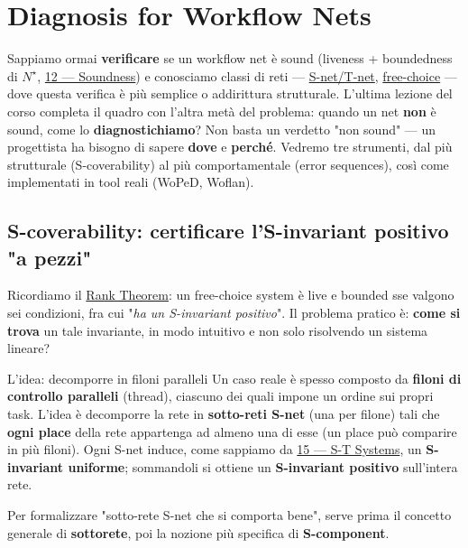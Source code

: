 \chapter{\texorpdfstring{Diagnosis for Workflow Nets}{Diagnosis for Workflow Nets}}
\label{ch:21}

Sappiamo ormai \textbf{verificare} se un workflow net è sound (liveness + boundedness di $N^\star$, \hyperref[ch:12]{12 — Soundness}) e conosciamo classi di reti — \hyperref[ch:15]{S-net/T-net}, \hyperref[ch:17]{free-choice} — dove questa verifica è più semplice o addirittura strutturale. L'ultima lezione del corso completa il quadro con l'altra metà del problema: quando un net \textbf{non} è sound, come lo \textbf{diagnostichiamo}? Non basta un verdetto "non sound" — un progettista ha bisogno di sapere \textbf{dove} e \textbf{perché}. Vedremo tre strumenti, dal più strutturale (S-coverability) al più comportamentale (error sequences), così come implementati in tool reali (WoPeD, Woflan).

\section{\texorpdfstring{S-coverability: certificare l'S-invariant positivo "a pezzi"}{S-coverability: certificare l'S-invariant positivo "a pezzi"}}

Ricordiamo il \hyperref[ch:17]{Rank Theorem}: un free-choice system è live e bounded sse valgono sei condizioni, fra cui "\emph{ha un S-invariant positivo}". Il problema pratico è: \textbf{come si trova} un tale invariante, in modo intuitivo e non solo risolvendo un sistema lineare?

\begin{boxtip}{L'idea: decomporre in filoni paralleli}
Un caso reale è spesso composto da \textbf{filoni di controllo paralleli} (thread), ciascuno dei quali impone un ordine sui propri task. L'idea è decomporre la rete in \textbf{sotto-reti S-net} (una per filone) tali che \textbf{ogni place} della rete appartenga ad almeno una di esse (un place può comparire in più filoni). Ogni S-net induce, come sappiamo da \hyperref[ch:15]{15 — S-T Systems}, un \textbf{S-invariant uniforme}; sommandoli si ottiene un \textbf{S-invariant positivo} sull'intera rete.
\end{boxtip}

Per formalizzare "sotto-rete S-net che si comporta bene", serve prima il concetto generale di \textbf{sottorete}, poi la nozione più specifica di \textbf{S-component}.

